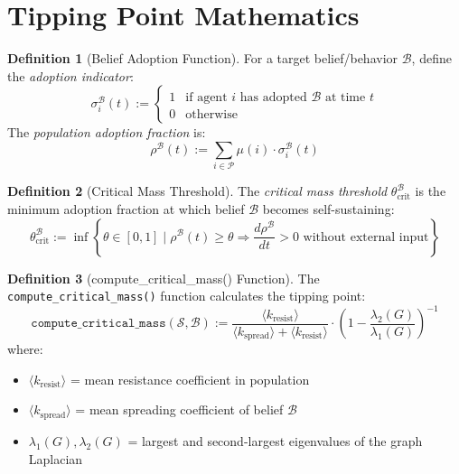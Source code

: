\documentclass[11pt,twoside]{book}
\theoremstyle{definition}
\newtheorem{definition}{Definition}[chapter]
\theoremstyle{plain}
\theoremstyle{remark}
\begin{document}
\section{Tipping Point Mathematics}

\begin{definition}[Belief Adoption Function]
\label{def:belief-adoption}
For a target belief/behavior $\mathcal{B}$, define the \emph{adoption indicator}:
\[
    \sigma_i^{\mathcal{B}}(t) := \begin{cases}
        1 & \text{if agent } i \text{ has adopted } \mathcal{B} \text{ at time } t \\
        0 & \text{otherwise}
    \end{cases}
\]
The \emph{population adoption fraction} is:
\[
    \rho^{\mathcal{B}}(t) := \sum_{i \in \mathcal{P}} \mu(i) \cdot \sigma_i^{\mathcal{B}}(t)
\]
\end{definition}

\begin{definition}[Critical Mass Threshold]
\label{def:critical-mass}
The \emph{critical mass threshold} $\theta_{\mathrm{crit}}^{\mathcal{B}}$ is the minimum adoption fraction at which belief $\mathcal{B}$ becomes self-sustaining:
\[
\boxed{
    \theta_{\mathrm{crit}}^{\mathcal{B}} := \inf \left\{ \theta \in [0,1] \;\Big|\;
    \rho^{\mathcal{B}}(t) \geq \theta \Rightarrow
    \frac{d\rho^{\mathcal{B}}}{dt} > 0 \text{ without external input} \right\}
}
\]
\end{definition}

\begin{definition}[compute\_critical\_mass() Function]
\label{def:compute-critical-mass}
The \texttt{compute\_critical\_mass()} function calculates the tipping point:
\[
\boxed{
    \mathtt{compute\_critical\_mass}(\mathcal{S}, \mathcal{B}) :=
    \frac{\langle k_{\mathrm{resist}} \rangle}{\langle k_{\mathrm{spread}} \rangle + \langle k_{\mathrm{resist}} \rangle}
    \cdot \left(1 - \frac{\lambda_2(G)}{\lambda_1(G)}\right)^{-1}
}
\]
where:
\begin{itemize}
    \item $\langle k_{\mathrm{resist}} \rangle$ = mean resistance coefficient in population
    \item $\langle k_{\mathrm{spread}} \rangle$ = mean spreading coefficient of belief $\mathcal{B}$
    \item $\lambda_1(G), \lambda_2(G)$ = largest and second-largest eigenvalues of the graph Laplacian
\end{itemize}
\end{definition}
\end{document}
